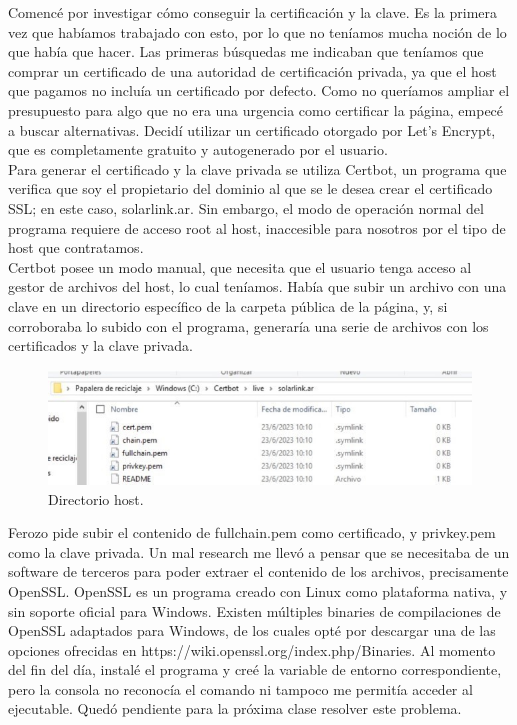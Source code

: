 Comencé por investigar cómo conseguir la certificación y la clave. Es la primera vez que habíamos trabajado con esto, por lo que no teníamos mucha noción de lo que había que hacer. Las primeras búsquedas me indicaban que teníamos que comprar un certificado de una autoridad de certificación privada, ya que el host que pagamos no incluía un certificado por defecto. Como no queríamos ampliar el presupuesto para algo que no era una urgencia como certificar la página, empecé a buscar alternativas. Decidí utilizar un certificado otorgado por Let’s Encrypt, que es completamente gratuito y autogenerado por el usuario.\\

Para generar el certificado y la clave privada se utiliza Certbot, un programa que verifica que soy el propietario del dominio al que se le desea crear el certificado SSL; en este caso, solarlink.ar. Sin embargo, el modo de operación normal del programa requiere de acceso root al host, inaccesible para nosotros por el tipo de host que contratamos.\\

Certbot posee un modo manual, que necesita que el usuario tenga acceso al gestor de archivos del host, lo cual teníamos. Había que subir un archivo con una clave en un directorio específico de la carpeta pública de la página, y, si corroboraba lo subido con el programa, generaría una serie de archivos con los certificados y la clave privada.\\

\begin{figure}[H]
    \centering
    \includegraphics[width=0.75\linewidth]{informes/Screenshot_15.jpg}
    \caption{Directorio host.}
    
\end{figure}

Ferozo pide subir el contenido de fullchain.pem como certificado, y privkey.pem como la clave privada. Un mal research me llevó a pensar que se necesitaba de un software de terceros para poder extraer el contenido de los archivos, precisamente OpenSSL. 
OpenSSL es un programa creado con Linux como plataforma nativa, y sin soporte oficial para Windows. Existen múltiples binaries de compilaciones de OpenSSL adaptados para Windows, de los cuales opté por descargar una de las opciones ofrecidas en https://wiki.openssl.org/index.php/Binaries. Al momento del fin del día, instalé el programa y creé la variable de entorno correspondiente, pero la consola no reconocía el comando ni tampoco me permitía acceder al ejecutable. Quedó pendiente para la próxima clase resolver este problema.\\

